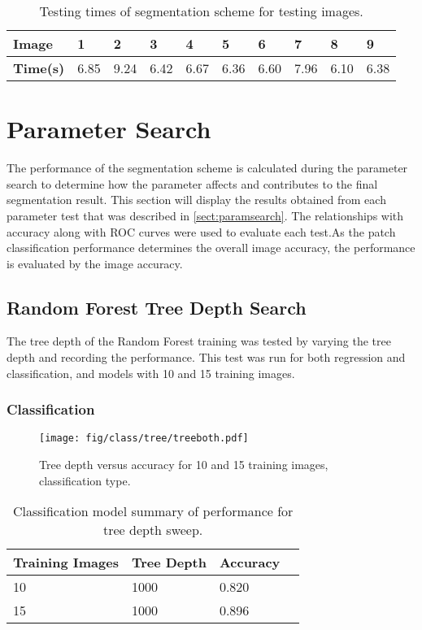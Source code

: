 \begin{table}[H]
\centering
\caption{Testing times of segmentation scheme for testing images.}

\begin{tabular}{|l|l|l|l|l|l|l|l|l|l|}
\hline
\textbf{Image}	& \textbf{1} & \textbf{2} & \textbf{3} & \textbf{4} & \textbf{5} &\textbf{6} &\textbf{7} & \textbf{8} &\textbf{9}\\
\hline
\textbf{Time(s)} & 6.85 & 9.24 & 6.42 & 6.67 & 6.36 & 6.60 & 7.96 & 6.10 & 6.38\\
\hline				    	 			   			    	 
\end{tabular}
\label{table:times}
\end{table}

\section{Parameter Search}
\label{sect:parametersearch}
The performance of the segmentation scheme is calculated during the parameter search to determine how the parameter affects and contributes to the final segmentation result. This section will display the results obtained from each parameter test that was described in \ref{sect:paramsearch}. The relationships with accuracy along with ROC curves were used to evaluate each test.As the patch classification performance determines the overall image accuracy, the performance is evaluated by the image accuracy.

\subsection{Random Forest Tree Depth Search}
The tree depth of the Random Forest training was tested by varying the tree depth and recording the performance. This test was run for both regression and classification, and models with 10 and 15 training images. 

\subsubsection{Classification}
\begin{figure}[H]
\centering
\texttt{[image: fig/class/tree/treeboth.pdf]}
\caption{Tree depth versus accuracy for 10 and 15 training images, classification type.}
\label{class:tree}
\end{figure}

\begin{table}[H]
\centering
\caption{Classification model summary of performance for tree depth sweep.}

\begin{tabular}{|l|l|l|l|}
\hline
 \textbf{Training Images} &	\textbf{Tree Depth} & \textbf{Accuracy}\\
\hline
10 & 1000 & 0.820\\
\hline				    	 			
15 & 1000 & 0.896 \\	
\hline		    	 
\end{tabular}
\label{table:classtree}
\end{table}

